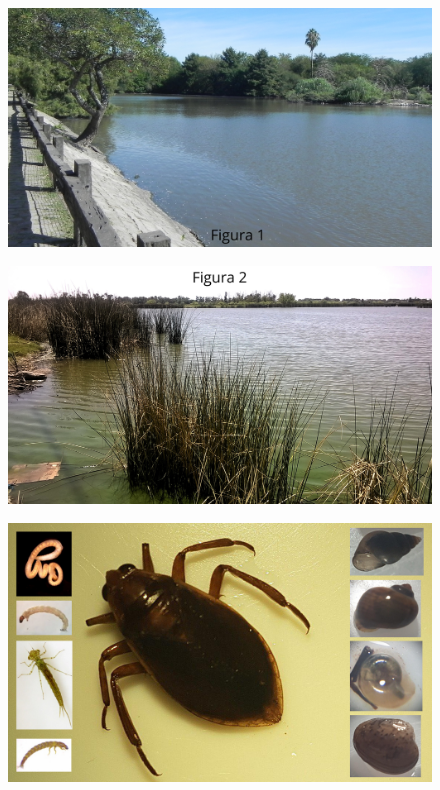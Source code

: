 \documentclass[final]{beamer}
\newlength{\onecolwid}
\begin{document}
\begin{frame}[t]
\begin{columns}[t]
\begin{column}{\onecolwid}
\begin{block}{ }
                \begin{multicols}{2}
                \begin{figure}
                	\vspace*{-0.90cm}
                    \includegraphics[width=0.9\linewidth]{lpu.jpg}
				\end{figure}
                \begin{figure}
                	\vspace*{-0.90cm}
                    \includegraphics[width=0.9\linewidth]{lp.jpg}
				\end{figure}
                \end{multicols}
                
                \begin{figure}
                    \includegraphics[width=0.95\linewidth]{popu.jpg}
				\end{figure}
                

\end{block}
\end{column}
\end{columns}
\end{frame}
\end{document}
